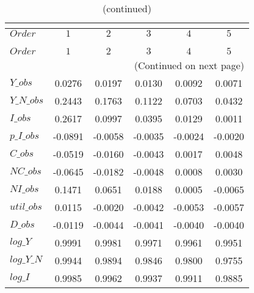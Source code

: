  
\begin{center}
\begin{longtable}{lccccc} 
\caption{COEFFICIENTS OF AUTOCORRELATION}\\
 \label{Table:th_autocorr_matrix}\\
\toprule 
$Order      $	 & 	 $          1$	 & 	 $          2$	 & 	 $          3$	 & 	 $          4$	 & 	 $          5$\\
\midrule \endfirsthead 
\caption{(continued)}\\
 \toprule \\ 
$Order      $	 & 	 $          1$	 & 	 $          2$	 & 	 $          3$	 & 	 $          4$	 & 	 $          5$\\
\midrule \endhead 
\midrule \multicolumn{6}{r}{(Continued on next page)} \\ \bottomrule \endfoot 
\bottomrule \endlastfoot 
$Y\_obs     $	 & 	     0.0276	 & 	     0.0197	 & 	     0.0130	 & 	     0.0092	 & 	     0.0071 \\ 
$Y\_N\_obs  $	 & 	     0.2443	 & 	     0.1763	 & 	     0.1122	 & 	     0.0703	 & 	     0.0432 \\ 
$I\_obs     $	 & 	     0.2617	 & 	     0.0997	 & 	     0.0395	 & 	     0.0129	 & 	     0.0011 \\ 
$p\_I\_obs  $	 & 	    -0.0891	 & 	    -0.0058	 & 	    -0.0035	 & 	    -0.0024	 & 	    -0.0020 \\ 
$C\_obs     $	 & 	    -0.0519	 & 	    -0.0160	 & 	    -0.0043	 & 	     0.0017	 & 	     0.0048 \\ 
$NC\_obs    $	 & 	    -0.0645	 & 	    -0.0182	 & 	    -0.0048	 & 	     0.0008	 & 	     0.0030 \\ 
$NI\_obs    $	 & 	     0.1471	 & 	     0.0651	 & 	     0.0188	 & 	     0.0005	 & 	    -0.0065 \\ 
$util\_obs  $	 & 	     0.0115	 & 	    -0.0020	 & 	    -0.0042	 & 	    -0.0053	 & 	    -0.0057 \\ 
$D\_obs     $	 & 	    -0.0119	 & 	    -0.0044	 & 	    -0.0041	 & 	    -0.0040	 & 	    -0.0040 \\ 
$log\_Y     $	 & 	     0.9991	 & 	     0.9981	 & 	     0.9971	 & 	     0.9961	 & 	     0.9951 \\ 
$log\_Y\_N  $	 & 	     0.9944	 & 	     0.9894	 & 	     0.9846	 & 	     0.9800	 & 	     0.9755 \\ 
$log\_I     $	 & 	     0.9985	 & 	     0.9962	 & 	     0.9937	 & 	     0.9911	 & 	     0.9885 \\ 

\end{longtable}
\end{center}
